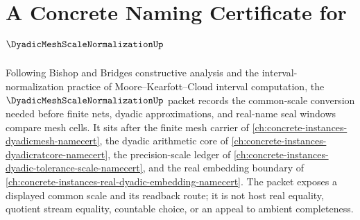 \chapter{A Concrete Naming Certificate for $\DyadicMeshScaleNormalizationUp$}
\label{ch:concrete-instances-dyadic-mesh-scale-normalization-namecert}

Following Bishop and Bridges constructive analysis and the interval-normalization practice of Moore--Kearfott--Cloud interval computation, the $\DyadicMeshScaleNormalizationUp$ packet records the common-scale conversion needed before finite nets, dyadic approximations, and real-name seal windows compare mesh cells. It sits after the finite mesh carrier of \autoref{ch:concrete-instances-dyadicmesh-namecert}, the dyadic arithmetic core of \autoref{ch:concrete-instances-dyadicratcore-namecert}, the precision-scale ledger of \autoref{ch:concrete-instances-dyadic-tolerance-scale-namecert}, and the real embedding boundary of \autoref{ch:concrete-instances-real-dyadic-embedding-namecert}. The packet exposes a displayed common scale and its readback route; it is not host real equality, quotient stream equality, countable choice, or an appeal to ambient completeness.

